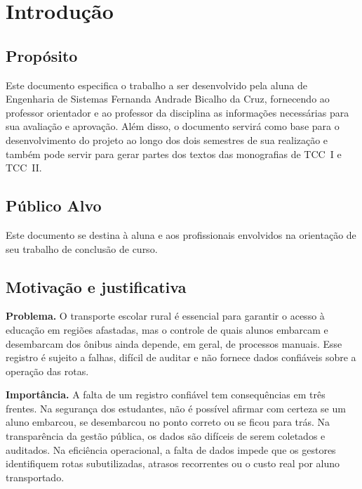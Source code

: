 \documentclass[
    12pt,
    oneside,
    a4paper,
    article,
    english,
    brazil
    ]{abntex2}
\newcommand{\nomealuna}{Fernanda Andrade Bicalho da Cruz}
\begin{document}
\newpage

\tableofcontents*
\newpage

\section{Introdução}

\subsection{Propósito}

Este documento especifica o trabalho a ser desenvolvido pela aluna de
Engenharia de Sistemas \nomealuna, fornecendo ao professor orientador e ao
professor da disciplina as informações necessárias para sua avaliação e
aprovação. Além disso, o documento servirá como base para o desenvolvimento do
projeto ao longo dos dois semestres de sua realização e também pode servir para
gerar partes dos textos das monografias de TCC~I e TCC~II.

\subsection{Público Alvo}

Este documento se destina à aluna e aos profissionais envolvidos na orientação
de seu trabalho de conclusão de curso.

\subsection{Motivação e justificativa}

\textbf{Problema.} O transporte escolar rural é essencial para garantir o
acesso à educação em regiões afastadas, mas o controle de quais alunos
embarcam e desembarcam dos ônibus ainda depende, em geral, de processos
manuais. Esse registro é sujeito a falhas, difícil de auditar e não fornece
dados confiáveis sobre a operação das rotas.

\textbf{Importância.} A falta de um registro confiável tem consequências em três
frentes. Na segurança dos estudantes, não é possível afirmar com certeza se um
aluno embarcou, se desembarcou no ponto correto ou se ficou para trás. Na
transparência da gestão pública, os dados são difíceis de serem coletados e
auditados. Na eficiência
operacional, a falta de dados impede que os gestores identifiquem rotas
subutilizadas, atrasos recorrentes ou o custo real por aluno transportado.
\end{document}
